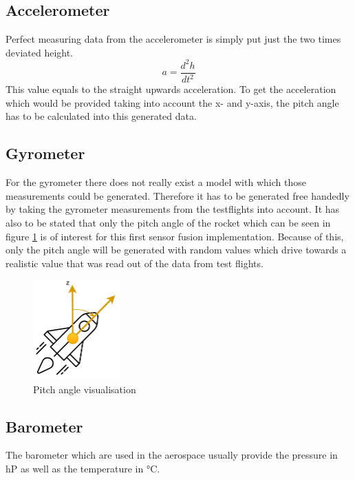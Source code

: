   \subsection{Accelerometer}
  Perfect measuring data from the accelerometer is simply put just the two times deviated height.
  $$a = \frac{d^2h}{dt^2}$$
  This value equals to the straight upwards acceleration. To get the acceleration which would be provided taking into account the x- and y-axis,
  the pitch angle has to be calculated into this generated data.

  \subsection{Gyrometer}
  For the gyrometer there does not really exist a model with which those measurements could be generated.
  Therefore it has to be generated free handedly by taking the gyrometer measurements from the testflights into account.
  It has also to be stated that only the pitch angle of the rocket which can be seen in figure \ref{fig:RocketPitchAngle} is of interest for this first sensor fusion implementation.
  Because of this, only the pitch angle will be generated with random values which drive towards a realistic value that was read out of the data from test flights.

  \begin{figure}[h!]
    \centering
    \includegraphics[width = 0.3\textwidth]{./Pictures/RocketSyMod.pdf}
    \caption{Pitch angle visualisation}
    \label{fig:RocketPitchAngle}
  \end{figure}


  \subsection{Barometer}
  The barometer which are used in the aerospace usually provide the pressure in hP as well as the temperature in °C.
